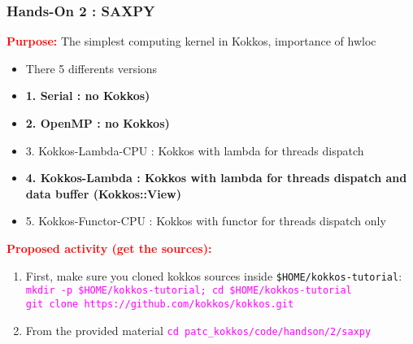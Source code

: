 \begin{frame}[fragile=singleslide]
  \frametitle{Hands-On 2 : SAXPY}

  \hypertarget{handson2}{}
  {\large \textcolor{red}{\bf Purpose:} The simplest computing kernel in Kokkos, importance of hwloc}

  
  \begin{itemize}
  \item There 5 differents versions
  \item \textbf{1. Serial : no Kokkos)}
  \item \textbf{2. OpenMP : no Kokkos)}
  \item 3. Kokkos-Lambda-CPU : Kokkos with lambda for threads dispatch
  \item \textbf{4. Kokkos-Lambda : Kokkos with lambda for threads dispatch and data buffer (Kokkos::View)}
  \item 5. Kokkos-Functor-CPU : Kokkos with functor for threads dispatch only
  \end{itemize}

  {\large \textcolor{red}{\bf Proposed activity (get the sources):}}
  {\small
    \begin{enumerate}
    \item First, make sure you cloned kokkos sources inside \texttt{\${HOME}/kokkos-tutorial}:\\
      \textcolor{magenta}{\texttt{mkdir -p \${HOME}/kokkos-tutorial; cd \${HOME}/kokkos-tutorial}}\\
      \textcolor{magenta}{\texttt{git clone  https://github.com/kokkos/kokkos.git}}
    \item From the provided material \textcolor{magenta}{\texttt{cd patc\_kokkos/code/handson/2/saxpy}}
    \end{enumerate}
  }
  
\end{frame}

